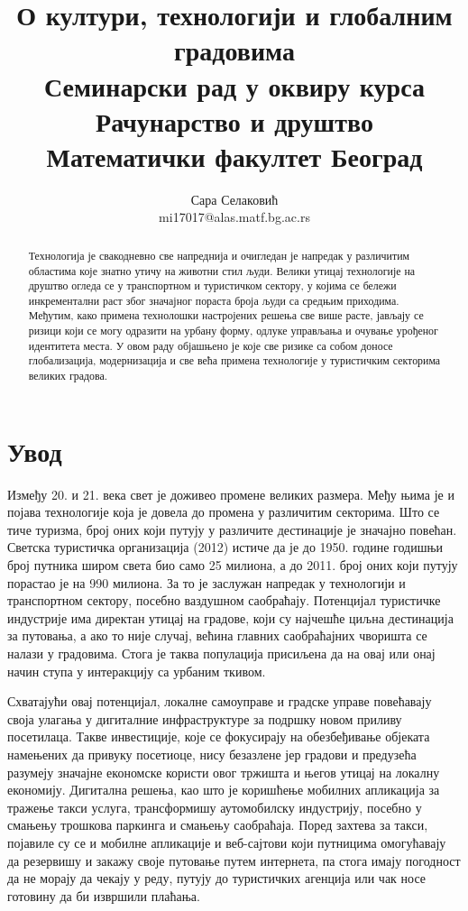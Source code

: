 \documentclass{article}
\title{О култури, технологији и глобалним градовима\\
    \small{Семинарски рад у оквиру курса\\Рачунарство и друштво\\Математички факултет Београд}}
\author{Сара Селаковић\\mi17017@alas.matf.bg.ac.rs}
\begin{document}
\maketitle

\begin{abstract}
Технологија је свакодневно све напреднија и очигледан је напредак у различитим областима које знатно утичу на животни стил људи. Велики утицај технологије на друштво огледа се у транспортном и туристичком сектору, у којима се бележи инкрементални раст због значајног пораста броја људи са средњим приходима. Међутим, како примена технолошки настројених решења све више расте, јављају се ризици који се могу одразити на урбану форму, одлуке управљања и очување урођеног идентитета места. У овом раду објашњено је које све ризике са собом доносе глобализација, модернизација и све већа примена технологије у туристичким секторима великих градова.

\end{abstract}

\newpage
\tableofcontents
\newpage

\section{Увод}

Између 20. и 21. века свет је доживео промене великих размера. Међу њима је и појава технологије која је довела до промена у различитим секторима. Што се тиче туризма, број оних који путују у различите дестинације је значајно повећан. Светска туристичка организација (2012) истиче да је до 1950. године годишњи број путника широм света био само 25 милиона, а до 2011. број оних који путују порастао је на 990 милиона. За то је заслужан напредак у технологији и транспортном сектору, посебно ваздушном саобраћају. Потенцијал туристичке индустрије има директан утицај на градове, који су најчешће циљна дестинација за путовања, а ако то није случај, већина главних саобраћајних чворишта се налази у градовима. Стога је таква популација присиљена да на овај или онај начин ступа у интеракцију са урбаним ткивом.

Схватајући овај потенцијал, локалне самоуправе и градске управе повећавају своја улагања у дигиталние инфраструктуре за подршку новом приливу посетилаца. Такве инвестиције, које се фокусирају на обезбеђивање објеката намењених да привуку посетиоце, нису безазлене јер градови и предузећа разумеју значајне економске користи овог тржишта и његов утицај на локалну економију. Дигитална решења, као што је коришћење мобилних апликација за тражење такси услуга, трансформишу аутомобилску индустрију, посебно у смањењу трошкова паркинга и смањењу саобраћаја. Поред захтева за такси, појавиле су се и мобилне апликације и веб-сајтови који путницима омогућавају да резервишу и закажу своје путовање путем интернета, па стога имају погодност да не морају да чекају у реду, путују до туристичких агенција или чак носе готовину да би извршили плаћања.
\end{document}
